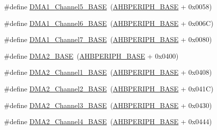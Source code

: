 \begin{DoxyCompactItemize}
\item 
\#define \mbox{\hyperlink{group___peripheral__memory__map_gac041a71cd6c1973964f847a68aa14478}{D\+M\+A1\+\_\+\+Channel5\+\_\+\+B\+A\+SE}}~(\mbox{\hyperlink{group___peripheral__memory__map_ga92eb5d49730765d2abd0f5b09548f9f5}{A\+H\+B\+P\+E\+R\+I\+P\+H\+\_\+\+B\+A\+SE}} + 0x0058)
\item 
\#define \mbox{\hyperlink{group___peripheral__memory__map_ga896c2c7585dd8bc3969cf8561f689d2d}{D\+M\+A1\+\_\+\+Channel6\+\_\+\+B\+A\+SE}}~(\mbox{\hyperlink{group___peripheral__memory__map_ga92eb5d49730765d2abd0f5b09548f9f5}{A\+H\+B\+P\+E\+R\+I\+P\+H\+\_\+\+B\+A\+SE}} + 0x006\+C)
\item 
\#define \mbox{\hyperlink{group___peripheral__memory__map_gaeee0d1f77d0db1db533016a09351166c}{D\+M\+A1\+\_\+\+Channel7\+\_\+\+B\+A\+SE}}~(\mbox{\hyperlink{group___peripheral__memory__map_ga92eb5d49730765d2abd0f5b09548f9f5}{A\+H\+B\+P\+E\+R\+I\+P\+H\+\_\+\+B\+A\+SE}} + 0x0080)
\item 
\#define \mbox{\hyperlink{group___peripheral__memory__map_gab72a9ae145053ee13d1d491fb5c1df64}{D\+M\+A2\+\_\+\+B\+A\+SE}}~(\mbox{\hyperlink{group___peripheral__memory__map_ga92eb5d49730765d2abd0f5b09548f9f5}{A\+H\+B\+P\+E\+R\+I\+P\+H\+\_\+\+B\+A\+SE}} + 0x0400)
\item 
\#define \mbox{\hyperlink{group___peripheral__memory__map_gad3bd6c4201d12f5d474518c1b02f8e3b}{D\+M\+A2\+\_\+\+Channel1\+\_\+\+B\+A\+SE}}~(\mbox{\hyperlink{group___peripheral__memory__map_ga92eb5d49730765d2abd0f5b09548f9f5}{A\+H\+B\+P\+E\+R\+I\+P\+H\+\_\+\+B\+A\+SE}} + 0x0408)
\item 
\#define \mbox{\hyperlink{group___peripheral__memory__map_ga22f39f23c879c699b88e04a629f69d1c}{D\+M\+A2\+\_\+\+Channel2\+\_\+\+B\+A\+SE}}~(\mbox{\hyperlink{group___peripheral__memory__map_ga92eb5d49730765d2abd0f5b09548f9f5}{A\+H\+B\+P\+E\+R\+I\+P\+H\+\_\+\+B\+A\+SE}} + 0x041\+C)
\item 
\#define \mbox{\hyperlink{group___peripheral__memory__map_ga6f2369b8bc155fb55a28891987605c2c}{D\+M\+A2\+\_\+\+Channel3\+\_\+\+B\+A\+SE}}~(\mbox{\hyperlink{group___peripheral__memory__map_ga92eb5d49730765d2abd0f5b09548f9f5}{A\+H\+B\+P\+E\+R\+I\+P\+H\+\_\+\+B\+A\+SE}} + 0x0430)
\item 
\#define \mbox{\hyperlink{group___peripheral__memory__map_ga01b063266473f290a55047654fbbfbee}{D\+M\+A2\+\_\+\+Channel4\+\_\+\+B\+A\+SE}}~(\mbox{\hyperlink{group___peripheral__memory__map_ga92eb5d49730765d2abd0f5b09548f9f5}{A\+H\+B\+P\+E\+R\+I\+P\+H\+\_\+\+B\+A\+SE}} + 0x0444)
\item 

\end{DoxyCompactItemize}
